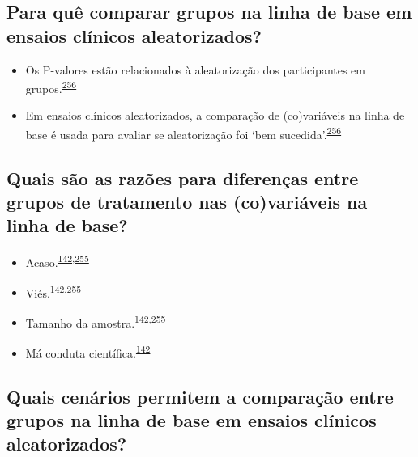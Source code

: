 \documentclass[
  a4paper,
]{book}
\begin{document}
\hypertarget{para-quuxea-comparar-grupos-na-linha-de-base-em-ensaios-cluxednicos-aleatorizados}{%
\subsection{Para quê comparar grupos na linha de base em ensaios clínicos aleatorizados?}\label{para-quuxea-comparar-grupos-na-linha-de-base-em-ensaios-cluxednicos-aleatorizados}}

\begin{itemize}
\item
  Os P-valores estão relacionados à aleatorização dos participantes em grupos.\textsuperscript{\protect\hyperlink{ref-Bolzern2019}{256}}
\item
  Em ensaios clínicos aleatorizados, a comparação de (co)variáveis na linha de base é usada para avaliar se aleatorização foi `bem sucedida'.\textsuperscript{\protect\hyperlink{ref-Bolzern2019}{256}}
\end{itemize}

\hypertarget{quais-suxe3o-as-razuxf5es-para-diferenuxe7as-entre-grupos-de-tratamento-nas-covariuxe1veis-na-linha-de-base}{%
\subsection{Quais são as razões para diferenças entre grupos de tratamento nas (co)variáveis na linha de base?}\label{quais-suxe3o-as-razuxf5es-para-diferenuxe7as-entre-grupos-de-tratamento-nas-covariuxe1veis-na-linha-de-base}}

\begin{itemize}
\item
  Acaso.\textsuperscript{\protect\hyperlink{ref-chen2020}{142},\protect\hyperlink{ref-Stang2018}{255}}
\item
  Viés.\textsuperscript{\protect\hyperlink{ref-chen2020}{142},\protect\hyperlink{ref-Stang2018}{255}}
\item
  Tamanho da amostra.\textsuperscript{\protect\hyperlink{ref-chen2020}{142},\protect\hyperlink{ref-Stang2018}{255}}
\item
  Má conduta científica.\textsuperscript{\protect\hyperlink{ref-chen2020}{142}}
\end{itemize}

\hypertarget{quais-cenuxe1rios-permitem-a-comparauxe7uxe3o-entre-grupos-na-linha-de-base-em-ensaios-cluxednicos-aleatorizados}{%
\subsection{Quais cenários permitem a comparação entre grupos na linha de base em ensaios clínicos aleatorizados?}\label{quais-cenuxe1rios-permitem-a-comparauxe7uxe3o-entre-grupos-na-linha-de-base-em-ensaios-cluxednicos-aleatorizados}}
\end{document}
